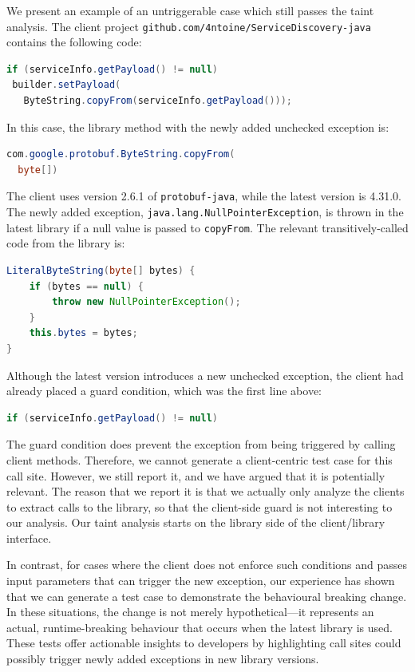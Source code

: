 We present an example of an untriggerable case which still passes the taint analysis. The client project \texttt{github.com/4ntoine/ServiceDiscovery-java} contains the following code:

\begin{lstlisting}[language=Java, basicstyle=\ttfamily, breaklines=true]
if (serviceInfo.getPayload() != null)
 builder.setPayload(
   ByteString.copyFrom(serviceInfo.getPayload()));
\end{lstlisting}

In this case, the library method with the newly added unchecked exception is:

\begin{lstlisting}[language=Java, basicstyle=\ttfamily]
com.google.protobuf.ByteString.copyFrom(
  byte[])
\end{lstlisting}

The client uses version 2.6.1 of \texttt{protobuf-java}, while the latest version is 4.31.0. The newly added exception, \texttt{java.lang.NullPointerException}, is thrown in the latest library if a null value is passed to \texttt{copyFrom}. The relevant transitively-called code from the library is:

\begin{lstlisting}[language=Java, basicstyle=\ttfamily]
LiteralByteString(byte[] bytes) {
    if (bytes == null) {
        throw new NullPointerException();
    }
    this.bytes = bytes;
}
\end{lstlisting}

Although the latest version introduces a new unchecked exception, the client had already placed a guard condition, which was the first line above:

\begin{lstlisting}[language=Java, basicstyle=\ttfamily]
  if (serviceInfo.getPayload() != null)
\end{lstlisting}

The guard condition does prevent the exception from being triggered by calling client methods. Therefore, we cannot generate a client-centric test case for this call site. However, we still report it, and we have argued that it is potentially relevant. The reason that we report it is that we actually only analyze the clients to extract calls to the library, so that the client-side guard is not interesting to our analysis. Our taint analysis starts on the library side of the client/library interface.

In contrast, for cases where the client does not enforce such conditions and passes input parameters that can trigger the new exception, our experience has shown that we can generate a test case to demonstrate the behavioural breaking change. In these situations, the change is not merely hypothetical—it represents an actual, runtime-breaking behaviour that occurs when the latest library is used. These tests offer actionable insights to developers by highlighting call sites could possibly trigger newly added exceptions in new library versions.


